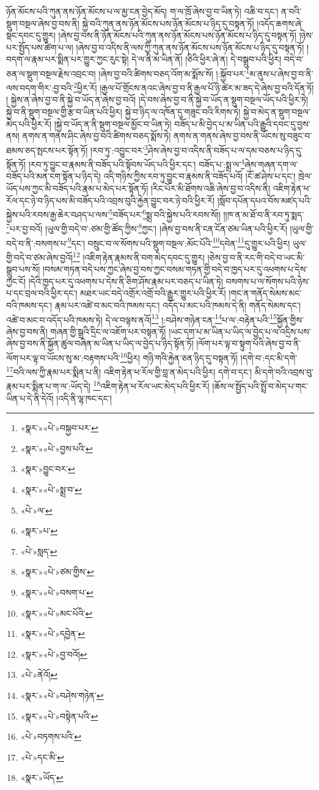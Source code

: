 ཉོན་མོངས་པའི་ཀུན་ནས་ཉོན་མོངས་པ་ལ་མྱ་ངན་བྱེད་མོད། ག་ལ་ཁྲོ་ཞེས་བྱ་བ་ཡིན་ཏེ། འཆི་བ་དང་། ན་བའི་སྡུག་བསྔལ་ཞེས་བྱ་བས་ནི། སྐྱེ་བའི་ཀུན་ནས་ཉོན་མོངས་པས་ཉོན་མོངས་པ་ཉིད་དུ་བསྟན་ཏོ། །འདོད་ཆགས་ཞེ་སྡང་དབང་དུ་གྱུར། །ཞེས་བྱ་བས་ནི་ཉོན་མོངས་པའི་ཀུན་ནས་ཉོན་མོངས་པས་ཉོན་མོངས་པ་ཉིད་དུ་བསྟན་ཏོ། །ཉེས་པར་སྤྱོད་པས་ཚིག་པ་ལ། །ཞེས་བྱ་བ་འདིས་ནི་ལས་ཀྱི་ཀུན་ནས་ཉོན་མོངས་པས་ཉོན་མོངས་པ་ཉིད་དུ་བསྟན་ཏོ། །བདག་ལ་རྣམ་པར་སྨིན་པར་གྱུར་ཀྱང་རུང་སྟེ། དེ་ལ་ནི་མ་ཡིན་ནོ། །ཅིའི་ཕྱིར་ཞེ་ན། དེ་བསྒྲུབ་པའི་ཕྱིར། བདེ་བ་ཅན་ལ་སྡུག་བསྔལ་རྗེས་འབྲང་བ། །ཞེས་བྱ་བའི་ཚིགས་བཅད་འོག་མ་སྨོས་སོ། །:སྐྱོབ་པར་\footnote{«སྣར་»«པེ་»བསྐྱབ་པར་}མ་ནུས་པ་ཞེས་བྱ་བ་ནི་ལས་བདག་གིར་:བྱ་བའི་\footnote{«སྣར་»«པེ་»བྱས་པའི་}ཕྱིར་རོ། །རྒྱལ་པོ་གྲོངས་ནའང་ཞེས་བྱ་བ་ནི་རྒྱལ་པོ་ཉི་ཚེར་མ་ཟད་དེ་ཞེས་བྱ་བའི་དོན་ཏོ། །
སྐྱེས་ན་ཞེས་བྱ་བ་ནི་སྐྱེ་བ་ཡོད་ན་ཞེས་བྱ་བའོ། །དེ་བས་ཞེས་བྱ་བ་ནི་སྐྱེ་བ་ཡོད་ན་སྡུག་བསྔལ་ཡོད་པའི་ཕྱིར་ཏེ། སྐྱེ་བ་ནི་སྡུག་བསྔལ་གྱི་རྩ་བ་ཡིན་པའི་ཕྱིར། སྐྱེ་བ་ཉིད་ལ་འཁོན་དུ་གཟུང་བའི་རིགས་ཏེ། སྐྱེ་བ་མེད་ན་སྡུག་བསྔལ་མེད་པའི་ཕྱིར་རོ། །སྐྱེ་བ་ཡོད་ན་ནི་སྡུག་བསྔལ་མྱོང་བ་ཡིན་ཏེ། བཟོད་པ་མི་བྱེད་པ་མ་ཡིན་པའི་རྒྱུའི་དབང་དུ་བྱས་ནས། ནགས་ན་གནས་ཤིང་ཞེས་བྱ་བའི་ཚིགས་བཅད་སྨོས་ཏེ། ནགས་ན་གནས་ཞེས་བྱ་བས་ནི་ཡོངས་སུ་བཟུང་བ་ཐམས་ཅད་སྤངས་པར་སྟོན་ཏོ། །རབ་ཏུ་:འབྱུང་བར་\footnote{«སྣར་»བྱུང་བར་}ཤེས་ཞེས་བྱ་བ་འདིས་ནི་བཟོད་པ་ལ་དམ་བཅས་པ་ཉིད་དུ་སྟོན་ཏོ། །རབ་ཏུ་བྱུང་བ་རྣམས་ནི་བཟོད་པའི་སྟོབས་ཡོད་པའི་ཕྱིར་དང་། བཟོད་པ་:སྨྲ་ལ་\footnote{«སྣར་»«པེ་»སྨྲ་བ་}ཞེས་གཞན་དག་ལ་བཟོད་པའི་མན་ངག་སྟོན་པ་ཉིད་དེ། འདི་གཉིས་ཀྱིས་རབ་ཏུ་བྱུང་བ་རྣམས་ནི་བཟོད་པའོ། །ངོ་ཚ་ཤེས་པ་དང་། ཁྲེལ་ཡོད་པས་ཀྱང་མི་བཟོད་པའི་རྣམ་པ་མེད་པར་སྟོན་ཏོ། །རིང་པོར་མི་ཐོགས་འཆི་ཞེས་བྱ་བ་འདིས་ནི། འཇིག་རྟེན་ཕ་རོལ་དང་ཉེ་བ་ཉིད་པས་མི་བཟོད་པའི་འབྲས་བུའི་རྐྱེན་བྱུང་བར་ཉེ་བའི་ཕྱིར་རོ། །སློབ་དཔོན་དཔའ་བོས་མཛད་པའི་སྐྱེས་པའི་རབས་རྒྱ་ཆེར་བཤད་པ་ལས་\footnote{«པེ་»ལ་}བཟོད་པར་\footnote{«སྣར་»པ་}སྨྲ་བའི་སྐྱེས་པའི་རབས་སོ།། །།ཁ་ན་མ་ཐོ་བ་ནི་རབ་ཏུ་སྨད་\footnote{«པེ་»སླད་}པར་བྱ་བའོ། །ཡུལ་གྱི་བདེ་བ་:ཙམ་གྱི་ཚོད་ཀྱིས་\footnote{«སྣར་»«པེ་»ཙམ་གྱིས་}ཀྱང་། །ཞེས་བྱ་བས་ནི་ངན་ངོན་ཙམ་ཡིན་པའི་ཕྱིར་རོ། །ཡུལ་གྱི་བདེ་བ་ནི་:བསགས་པ་\footnote{«སྣར་»«པེ་»བསག་པ་}དང་། བསྲུང་བ་ལ་སོགས་པའི་སྡུག་བསྔལ་:མོང་པོའི་\footnote{«སྣར་»«པེ་»མང་པོའི་}དབེན་\footnote{«སྣར་»«པེ་»དབྱེན་}དུ་གྱུར་པའི་ཕྱིར། ཡུལ་གྱི་བདེ་བ་ཙམ་ཞེས་བྱའོ།\footnote{«སྣར་»«པེ་»བྱ་བའོ།} །འཇིག་རྟེན་རྣམས་ནི་བག་མེད་དབང་དུ་གྱུར། །ཅེས་བྱ་བ་ནི་རང་གི་བདེ་བ་ཡང་མི་སྒྲུབ་པས་སོ། །བསམ་གཏན་བདེ་པས་ཀྱང་ཞེས་བྱ་བས་ཀྱང་བསམ་གཏན་གྱི་བདེ་བ་ཁྱད་པར་དུ་འཕགས་པ་དེས་ཀྱང་ངོ། །དེའི་ཁྱད་པར་དུ་འཕགས་པ་དེས་ནི་ཅིག་ཤོས་རྣམ་པར་བཅད་པ་ཡིན་ཏེ། བསགས་པ་ལ་སོགས་པའི་ཉེས་པ་དང་བྲལ་བའི་ཕྱིར་དང་། མཐར་ཡང་བདེ་འགྲོར་འགྲོ་བའི་རྒྱུར་གྱུར་པའི་ཕྱིར་རོ། །གང་ན་གནོད་སེམས་མང་བའི་ཁམས་དང་། རྣམ་པར་འཚེ་བ་མང་བའི་ཁམས་དང་། འདོད་པ་མང་པའི་ཁམས་དེ་ནི། གནོད་སེམས་དང་། འཚེ་བ་མང་བ་འདོད་པའི་ཁམས་ཏེ། དེ་ལ་བལྟས་ནའོ།\footnote{«པེ་»ནེའོ།} །:བཤེས་གཉེན་ངན་\footnote{«སྣར་»«པེ་»བཤེས་གཉེན་}པ་ལ་:བརྟེན་པའི་\footnote{«སྣར་»«པེ་»བསྟེན་པའི་}སྐྱོན་གྱིས་ཞེས་བྱ་བས་ནི། གཞན་གྱི་སྒྲའི་དྲིང་ལ་འཇོག་པར་བསྟན་ཏོ། །ཡང་དག་པ་མ་ཡིན་པ་ཡིད་ལ་བྱེད་པ་ལ་འདྲིས་པས་ཞེས་བྱ་བས་ནི་སྐྱོན་ཚུལ་བཞིན་མ་ཡིན་པ་ཡིད་ལ་བྱེད་པ་ཉིད་སྟོན་ཏོ། །ལོག་པར་ལྟ་བ་སྟུག་པོའི་ཞེས་བྱ་བ་ནི་ལོག་པར་ལྟ་བ་ཡོངས་སུ་མ་:བརྟགས་པའི་\footnote{«པེ་»བཏགས་པའི་}ཕྱིར། གཉི་གའི་རྐྱེན་ཅན་ཉིད་དུ་བསྟན་ཏོ། །དགེ་བ་:དང་མི་དགེ་\footnote{«པེ་»དང་མི་}བའི་ལས་ཀྱི་རྣམ་པར་སྨིན་པ་ནི། འཇིག་རྟེན་ཕ་རོལ་གྱི་བླ་ན་མེད་པའི་ཕྱིར། དགེ་བ་དང་། མི་དགེ་བའི་འབྲས་བུ་རྣམ་པར་སྨིན་པ་ག་ལ་:ཡོད་དེ། \footnote{«སྣར་»ཡོད་}འཇིག་རྟེན་ཕ་རོལ་ཡང་མེད་པའི་ཕྱིར་རོ། །ཆོས་ལ་སྤྱོད་པའི་སྤྲོ་བ་མེད་པ་གང་ཡིན་པ་དེ་ནི་དེའོ། །འདི་ནི་ལྷ་ཁང་དང་། 